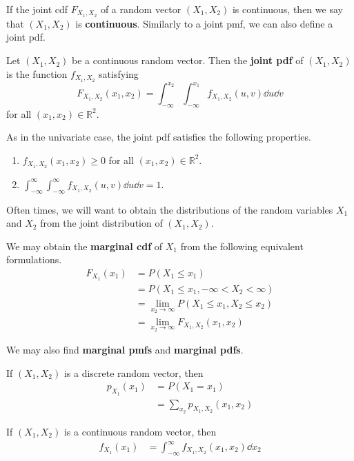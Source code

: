If the joint cdf $F_{X_1,X_2}$ of a random vector $(X_1,X_2)$ is continuous, then we say that $(X_1,X_2)$ is \textbf{continuous}. Similarly to a joint pmf, we can also define a joint pdf.

\begin{definition}
	Let $(X_1,X_2)$ be a continuous random vector. Then the \textbf{joint pdf} of $(X_1,X_2)$ is the function $f_{X_1,X_2}$ satisfying
	$$F_{X_1,X_2}(x_1,x_2)=\int_{-\infty}^{x_2}\int_{-\infty}^{x_1}f_{X_1,X_2}(u,v)\dd u\dd v$$
	for all $(x_1,x_2)\in\mathbb R^2$.
\end{definition}

As in the univariate case, the joint pdf satisfies the following properties.
\begin{enumerate}
	\item $f_{X_1,X_2}(x_1,x_2)\geq 0$ for all $(x_1,x_2)\in\mathbb R^2$.
	\item $\int_{-\infty}^{\infty}\int_{-\infty}^{\infty}f_{X_1,X_2}(u,v)\dd u\dd v=1$.
\end{enumerate}

Often times, we will want to obtain the distributions of the random variables $X_1$ and $X_2$ from the joint distribution of $(X_1,X_2)$.

We may obtain the \textbf{marginal cdf} of $X_1$ from the following equivalent formulations.
\begin{align*}
	F_{X_1}(x_1)&=P(X_1\leq x_1)\\
	&=P(X_1\leq x_1,-\infty<X_2<\infty)\\
	&=\lim_{x_2\to\infty}P(X_1\leq x_1,X_2\leq x_2)\\
	&=\lim_{x_2\to\infty} F_{X_1,X_2}(x_1,x_2)
\end{align*}

We may also find \textbf{marginal pmfs} and \textbf{marginal pdfs}.

If $(X_1,X_2)$ is a discrete random vector, then
\begin{align*}
	p_{X_1}(x_1)&=P(X_1=x_1)\\
	&=\sum_{x_2}p_{X_1,X_2}(x_1,x_2)
\end{align*}

If $(X_1,X_2)$ is a continuous random vector, then
\begin{align*}
	f_{X_1}(x_1)&=\int_{-\infty}^{\infty}f_{X_1,X_2}(x_1,x_2)\dd{x_2}\\
\end{align*}

